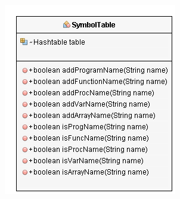 \documentclass[10]{amsart}
\begin{document}
\begin{appendices}
\begin{figure}
\end{figure}
\begin{figure}
	\includegraphics{SymTableUML.png}
\end{figure}

\end{appendices}
\end{document}
